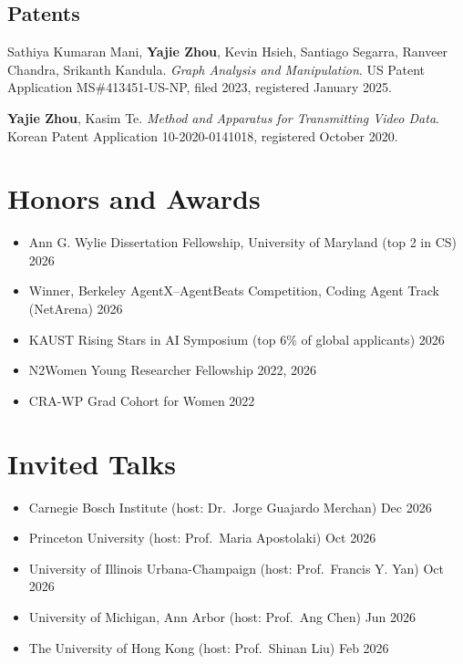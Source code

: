 \documentclass[11pt,letterpaper]{article}
\newcommand{\dateditem}[2]{\item #1 \hfill #2}
\begin{document}
\subsection{Patents}

\begin{enumerate}[label={[P\arabic*]},leftmargin=2.6em]
    \item Sathiya Kumaran Mani, \textbf{Yajie Zhou}, Kevin Hsieh, Santiago Segarra, Ranveer Chandra, Srikanth Kandula.
      \textit{Graph Analysis and Manipulation}. US Patent Application MS\#413451-US-NP, filed 2023, registered January 2025.
    \item \textbf{Yajie Zhou}, Kasim Te.
      \textit{Method and Apparatus for Transmitting Video Data}. Korean Patent Application 10-2020-0141018, registered October 2020.
\end{enumerate}


\section{Honors and Awards}

\begin{itemize}[label={},leftmargin=0pt]
  \dateditem{Ann G. Wylie Dissertation Fellowship, University of Maryland (top 2 in CS)}{2026}
  \dateditem{Winner, Berkeley AgentX--AgentBeats Competition, Coding Agent Track (NetArena)}{2026}
  \dateditem{KAUST Rising Stars in AI Symposium (top 6\% of global applicants)}{2026}
  \dateditem{N2Women Young Researcher Fellowship}{2022, 2026}
  \dateditem{CRA-WP Grad Cohort for Women}{2022}
\end{itemize}


\section{Invited Talks}

\begin{itemize}[label={},leftmargin=0pt]
  \dateditem{Carnegie Bosch Institute (host: Dr.\ Jorge Guajardo Merchan)}{Dec 2026}
  \dateditem{Princeton University (host: Prof.\ Maria Apostolaki)}{Oct 2026}
  \dateditem{University of Illinois Urbana-Champaign (host: Prof.\ Francis Y. Yan)}{Oct 2026}
  \dateditem{University of Michigan, Ann Arbor (host: Prof.\ Ang Chen)}{Jun 2026}
  \dateditem{The University of Hong Kong (host: Prof.\ Shinan Liu)}{Feb 2026}
\end{itemize}
\end{document}
